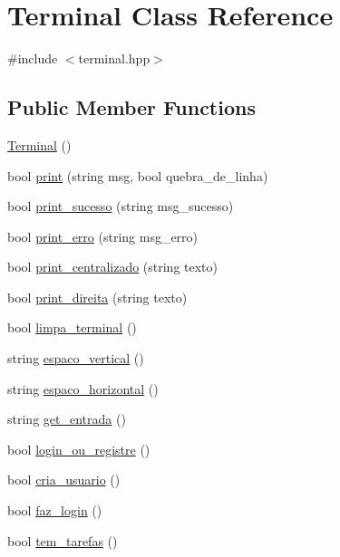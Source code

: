 \hypertarget{classTerminal}{}\section{Terminal Class Reference}
\label{classTerminal}


{\ttfamily \#include $<$terminal.\+hpp$>$}

\subsection*{Public Member Functions}
\begin{DoxyCompactItemize}
\item 
\hyperlink{classTerminal_aa448509b5aa1ece53c3d86385655be0e}{Terminal} ()
\item 
bool \hyperlink{classTerminal_aed7124f0bc24d4b77971f16d2f186a9b}{print} (string msg, bool quebra\+\_\+de\+\_\+linha)
\item 
bool \hyperlink{classTerminal_ac93c6cd6c16b785783ad21ff7bf80ef6}{print\+\_\+sucesso} (string msg\+\_\+sucesso)
\item 
bool \hyperlink{classTerminal_af5e724ead0f64b07a48d87a9942997e8}{print\+\_\+erro} (string msg\+\_\+erro)
\item 
bool \hyperlink{classTerminal_ab0f81f0dd06888554d817481140c953d}{print\+\_\+centralizado} (string texto)
\item 
bool \hyperlink{classTerminal_a9bb92733eb900a01a88c4e2eee17d938}{print\+\_\+direita} (string texto)
\item 
bool \hyperlink{classTerminal_a7aa126267c7e71ed99082884610496c9}{limpa\+\_\+terminal} ()
\item 
string \hyperlink{classTerminal_af3b082b98755b9f60f02315e5d207538}{espaco\+\_\+vertical} ()
\item 
string \hyperlink{classTerminal_a74aa95517ba338132e791a2aefb77b7a}{espaco\+\_\+horizontal} ()
\item 
string \hyperlink{classTerminal_a55827d690f15a0b401d6ee01ae710020}{get\+\_\+entrada} ()
\item 
bool \hyperlink{classTerminal_a46650fa9443239037a1a75afd963e51b}{login\+\_\+ou\+\_\+registre} ()
\item 
bool \hyperlink{classTerminal_a7c4d6a98c2ae96474e6745ce0c18d459}{cria\+\_\+usuario} ()
\item 
bool \hyperlink{classTerminal_a83ec130f3b19df9b382d99484669a509}{faz\+\_\+login} ()
\item 
bool \hyperlink{classTerminal_af5853d7279661f75d23fb44ade174da2}{tem\+\_\+tarefas} ()

\end{DoxyCompactItemize}
